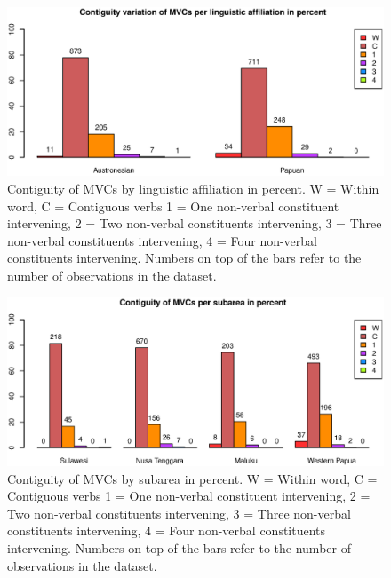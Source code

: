 \begin{figure}
\includegraphics[width=\columnwidth]{figures/Contiguity_Family.eps}
\caption[Contiguity of MVCs by linguistic affiliation]{Contiguity of MVCs by linguistic affiliation in percent. W = Within word, C = Contiguous verbs 1 = One non-verbal constituent intervening, 2 = Two non-verbal constituents intervening, 3 = Three non-verbal constituents intervening, 4 = Four non-verbal constituents intervening. Numbers on top of the bars refer to the number of observations in the dataset.}\label{fig:adj-family}
\end{figure}
\begin{figure}
\includegraphics[width=\columnwidth]{figures/Contiguity_Group.eps}
\caption[Contiguity of MVCs by subarea]{Contiguity of MVCs by subarea in percent. W = Within word, C = Contiguous verbs 1 = One non-verbal constituent intervening, 2 = Two non-verbal constituents intervening, 3 = Three non-verbal constituents intervening, 4 = Four non-verbal constituents intervening. Numbers on top of the bars refer to the number of observations in the dataset.}\label{fig:adj-group}
\end{figure}

